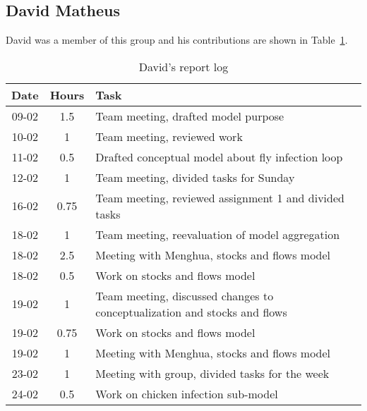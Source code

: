 
\subsection{David Matheus}
David was a member of this group and his contributions are shown in Table~\ref{tab:david_log}. 
\begin{longtable}[c]{c|c|m{35em}}
\caption{David's report log}
\label{tab:david_log}\\
\textbf{Date}& \textbf{Hours} & \textbf{Task} \\
\hline
\endfirsthead
%
\endhead
%
09-02   &   1.5     &   Team meeting, drafted model purpose                                         \\
10-02   &   1       &   Team meeting, reviewed work                                                 \\
11-02   &   0.5     &   Drafted conceptual model about fly infection loop                           \\
12-02   &   1       &   Team meeting, divided tasks for Sunday                                      \\
16-02   &   0.75    &   Team meeting, reviewed assignment 1 and divided tasks                       \\
18-02   &   1       &   Team meeting, reevaluation of model aggregation                             \\
18-02   &   2.5     &   Meeting with Menghua, stocks and flows model                                \\
18-02   &   0.5     &   Work on stocks and flows model                                              \\
19-02   &   1       &   Team meeting, discussed changes to conceptualization and stocks and flows   \\
19-02   &   0.75    &   Work on stocks and flows model                                              \\
19-02   &   1       &   Meeting with Menghua, stocks and flows model                                \\
23-02   &   1       &   Meeting with group, divided tasks for the week                              \\
24-02   &   0.5     &   Work on chicken infection sub-model                                         \\

\end{longtable}
